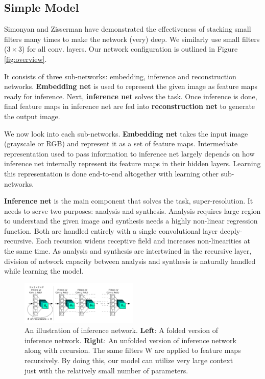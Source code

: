\documentclass[10pt,twocolumn,letterpaper]{article}
\begin{document}
\subsection{Simple Model}

Simonyan and Zisserman \cite{simonyan2015very} have demonstrated the effectiveness of stacking small filters many times to make the network (very) deep. We similarly use small filters ($3\times3$) for all conv. layers. 
Our network configuration is outlined in Figure \ref{fig:overview}.

It consists of three sub-networks: embedding, inference and reconstruction networks.  \textbf{Embedding net} is used to represent the given image as feature maps ready for inference. Next, \textbf{inference net} solves the task. Once inference is done, final feature maps in inference net are fed into \textbf{reconstruction net} to generate the output image.

We now look into each sub-networks. \textbf{Embedding net} takes the input image (grayscale or RGB) and represent it as a set of feature maps. Intermediate representation used to pass information to inference net largely depends on how inference net internally represent its feature maps in their hidden layers. Learning this representation is done end-to-end altogether with learning other sub-networks.


\textbf{Inference net} is the main component that solves the task, super-resolution. It needs to serve two purposes: analysis and synthesis. Analysis requires large region to understand the given image and synthesis needs a highly non-linear regression function. Both are handled entirely with a single convolutional layer deeply-recursive. Each recursion widens receptive field and increases non-linearities at the same time. As analysis and synthesis are intertwined in the recursive layer, division of network capacity between analysis and synthesis is naturally handled while learning the model. 

\begin{figure}
	\includegraphics[width=0.5\textwidth]{figs/f2}
	\caption {An illustration of inference network. \textbf{Left}: A folded version of inference network. \textbf{Right}: An unfolded version of inference network along with recursion. The same filters W are applied to feature maps recursively. By doing this, our model can utilize very large context just with the relatively small number of parameters.}
\end{figure}
\end{document}
